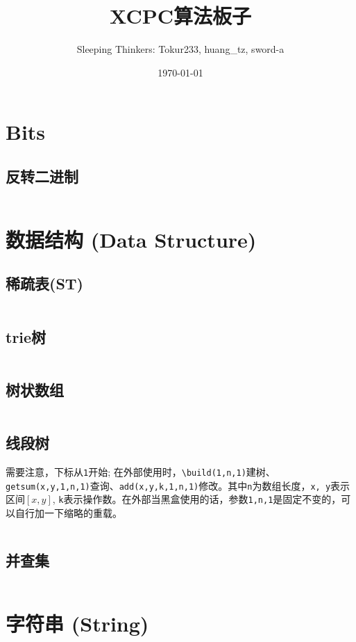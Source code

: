 \documentclass[openany,a4paper]{book}
\title{\Huge XCPC算法板子}
\author{Sleeping Thinkers: Tokur233, huang\_tz, sword-a}
\date{\today}
\begin{document}
\maketitle

\tableofcontents

\chapter{Bits}

\section{反转二进制}
\inputminted{cpp}{Bits/bits.h}

\chapter{数据结构 (Data Structure)}

\section{稀疏表(ST)}
\inputminted{cpp}{DataStructure/ST.h}

\section{trie树}
\inputminted{cpp}{DataStructure/trie.h}

\section{树状数组}
\inputminted{cpp}{DataStructure/binaryIndexedTree.h}

\section{线段树}
需要注意，下标从\verb|1|开始; 在外部使用时，\verb|\build(1,n,1)|建树、\verb|getsum(x,y,1,n,1)|查询、\verb|add(x,y,k,1,n,1)|修改。其中\verb|n|为数组长度，\verb|x, y|表示区间$[x,y]$, \verb|k|表示操作数。在外部当黑盒使用的话，参数\verb|1,n,1|是固定不变的，可以自行加一下缩略的重载。
\inputminted{cpp}{DataStructure/segmentTree.h}
\section{并查集}
\inputminted{cpp}{DataStructure/disjointSet.h}

\chapter{字符串 (String)}
\end{document}
